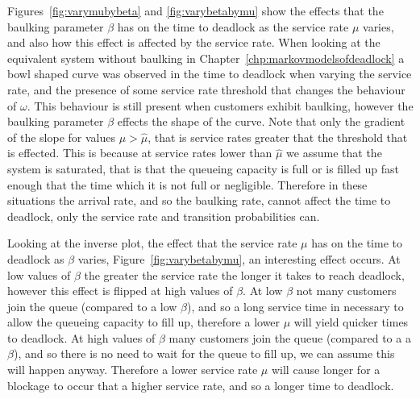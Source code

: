 \documentclass{article}
\begin{document}
Figures~\ref{fig:varymubybeta} and \ref{fig:varybetabymu} show the effects that the baulking parameter $\beta$ has on the time to deadlock as the service rate $\mu$ varies, and also how this effect is affected by the service rate.
When looking at the equivalent system without baulking in Chapter~\ref{chp:markovmodelsofdeadlock} a bowl shaped curve was observed in the time to deadlock when varying the service rate, and the presence of some service rate threshold that changes the behaviour of $\omega$. This behaviour is still present when customers exhibit baulking, however the baulking parameter $\beta$ effects the shape of the curve. Note that only the gradient of the slope for values $\mu > \hat{\mu}$, that is service rates greater that the threshold that is effected. This is because at service rates lower than $\hat{\mu}$ we assume that the system is saturated, that is that the queueing capacity is full or is filled up fast enough that the time which it is not full or negligible. Therefore in these situations the arrival rate, and so the baulking rate, cannot affect the time to deadlock, only the service rate and transition probabilities can.

Looking at the inverse plot, the effect that the service rate $\mu$ has on the time to deadlock as $\beta$ varies, Figure~\ref{fig:varybetabymu}, an interesting effect occurs. At low values of $\beta$ the greater the service rate the longer it takes to reach deadlock, however this effect is flipped at high values of $\beta$. At low $\beta$ not many customers join the queue (compared to a low $\beta$), and so a long service time in necessary to allow the queueing capacity to fill up, therefore a lower $\mu$ will yield quicker times to deadlock. At high values of $\beta$ many customers join the queue (compared to a a $\beta$), and so there is no need to wait for the queue to fill up, we can assume this will happen anyway. Therefore a lower service rate $\mu$ will cause longer for a blockage to occur that a higher service rate, and so a longer time to deadlock.
\end{document}
